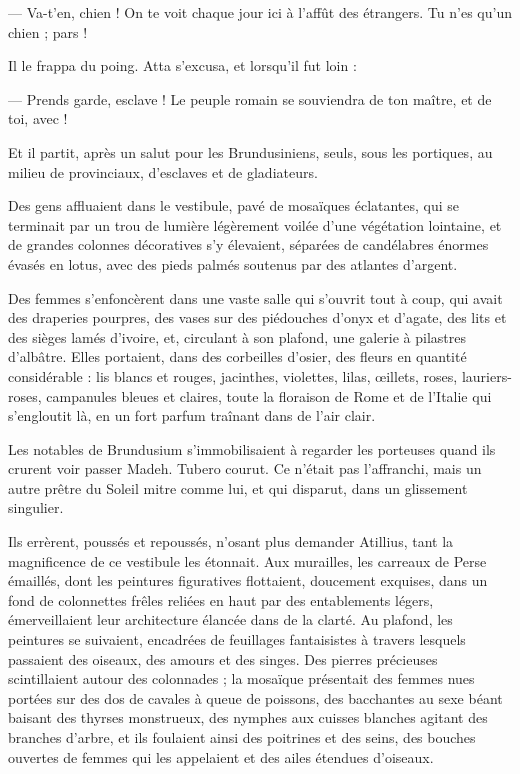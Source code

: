 \documentclass[a4paper, 11pt, oneside, polutonikogreek, french]{article}
\begin{document}
--- Va-t'en, chien ! On te voit chaque jour ici à l'affût des étrangers. Tu n'es qu'un chien ; pars !

Il le frappa du poing. Atta s'excusa, et lorsqu'il fut loin :

--- Prends garde, esclave ! Le peuple romain se souviendra de ton maître, et de toi, avec !

Et il partit, après un salut pour les Brundusiniens, seuls, sous les portiques, au milieu de provinciaux, d'esclaves et de gladiateurs.

Des gens affluaient dans le vestibule, pavé de mosaïques éclatantes, qui se terminait par un trou de lumière légèrement voilée d'une végétation lointaine, et de grandes colonnes décoratives s'y élevaient, séparées de candélabres énormes évasés en lotus, avec des pieds palmés soutenus par des atlantes d'argent.

Des femmes s'enfoncèrent dans une vaste salle qui s'ouvrit tout à coup, qui avait des draperies pourpres, des vases sur des piédouches d'onyx et d'agate, des lits et des sièges lamés d'ivoire, et, circulant à son plafond, une galerie à pilastres d'albâtre. Elles portaient, dans des corbeilles d'osier, des fleurs en quantité considérable : lis blancs et rouges, jacinthes, violettes, lilas, œillets, roses, lauriers-roses, campanules bleues et claires, toute la floraison de Rome et de l'Italie qui s'engloutit là, en un fort parfum traînant dans de l'air clair.

Les notables de Brundusium s'immobilisaient à regarder les porteuses quand ils crurent voir passer Madeh. Tubero courut. Ce n'était pas l'affranchi, mais un autre prêtre du Soleil mitre comme lui, et qui disparut, dans un glissement singulier.

Ils errèrent, poussés et repoussés, n'osant plus demander Atillius, tant la magnificence de ce vestibule les étonnait. Aux murailles, les carreaux de Perse émaillés, dont les peintures figuratives flottaient, doucement exquises, dans un fond de colonnettes frêles reliées en haut par des entablements légers, émerveillaient leur architecture élancée dans de la clarté. Au plafond, les peintures se suivaient, encadrées de feuillages fantaisistes à travers lesquels passaient des oiseaux, des amours et des singes. Des pierres précieuses scintillaient autour des colonnades ; la mosaïque présentait des femmes nues portées sur des dos de cavales à queue de poissons, des bacchantes au sexe béant baisant des thyrses monstrueux, des nymphes aux cuisses blanches agitant des branches d'arbre, et ils foulaient ainsi des poitrines et des seins, des bouches ouvertes de femmes qui les appelaient et des ailes étendues d'oiseaux.
\end{document}
